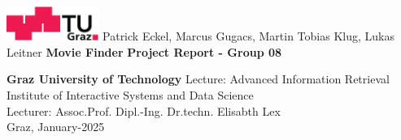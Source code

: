 \documentclass[../main.tex]{subfiles}
\begin{document}
\begin{titlepage}
	{\sffamily
		\begin{center}
			\includegraphics[width=30mm]{figures/TU_Graz_Logo}
			\vfill\vfill\vfill
			\vfill\vfill\vfill
			    {   Patrick Eckel,
                    Marcus Gugacs,
                    Martin Tobias Klug,
                    Lukas Leitner
                }
			\vfill\vfill\vfill
			    {\LARGE\bfseries Movie Finder}
			\vfill\vfill\vfill
			\vfill\vfill\vfill
			    {\bfseries\large Project Report - Group 08 } 
			\vfill\vfill\vfill
			 
			\vfill
			    {\bfseries\large Graz University of Technology}
			\vfill\vfill\vfill
    			Lecture:
    			{Advanced Information Retrieval} 
			\vfill
    			{Institute of Interactive Systems and Data Science}\\
    			Lecturer: Assoc.Prof. Dipl.-Ing. Dr.techn. Elisabth Lex \\
			\vfill
			\vfill\vfill\vfill
			    Graz, January-2025 %
		\end{center}
	}
\end{titlepage}
\end{document}
